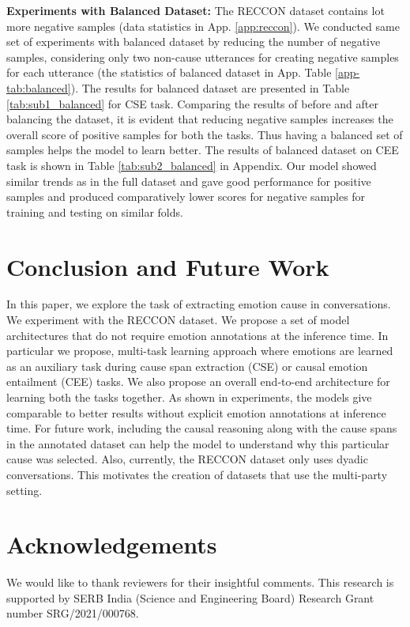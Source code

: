 \documentclass{article}
\begin{document}
\noindent\textbf{Experiments with Balanced Dataset:}
The RECCON dataset contains lot more negative samples (data statistics in App. \ref{app:reccon}). We conducted same set of experiments with balanced dataset by reducing the number of negative samples, considering only two non-cause utterances for creating negative samples for each utterance (the statistics of balanced dataset in App. Table \ref{app-tab:balanced}). The results for balanced dataset are presented in Table \ref{tab:sub1_balanced} for CSE task. Comparing the results of before and after balancing the dataset, it is evident that reducing negative samples increases the overall score of positive samples for both the tasks. Thus having a balanced set of samples helps the model to learn better. The results of balanced dataset on CEE task is shown in Table \ref{tab:sub2_balanced} in Appendix. Our model showed similar trends as in the full dataset and gave good performance for positive samples and produced comparatively lower scores for negative samples for training and testing on similar folds. 





 \section{Conclusion and Future Work}
\vspace{-3mm}
In this paper, we explore the task of extracting emotion cause in conversations. We experiment with the RECCON dataset. We propose a set of model architectures that do not require emotion annotations at the inference time. In particular we propose, multi-task learning approach where emotions are learned as an auxiliary task during cause span extraction (CSE) or causal emotion entailment (CEE) tasks. We also propose an overall end-to-end architecture for learning both the tasks together. As shown in experiments, the models give  comparable to better results without explicit emotion annotations at inference time. For future work, including the causal reasoning along with the cause spans in the annotated dataset can help the model to understand why this particular cause was selected. Also, currently, the RECCON dataset only uses dyadic conversations. This motivates the creation of datasets that use the multi-party setting. 

%
 
\section{Acknowledgements}
We would like to thank reviewers for their insightful comments. This research is supported by SERB India (Science and Engineering Board) Research Grant number SRG/2021/000768. 
\end{document}
